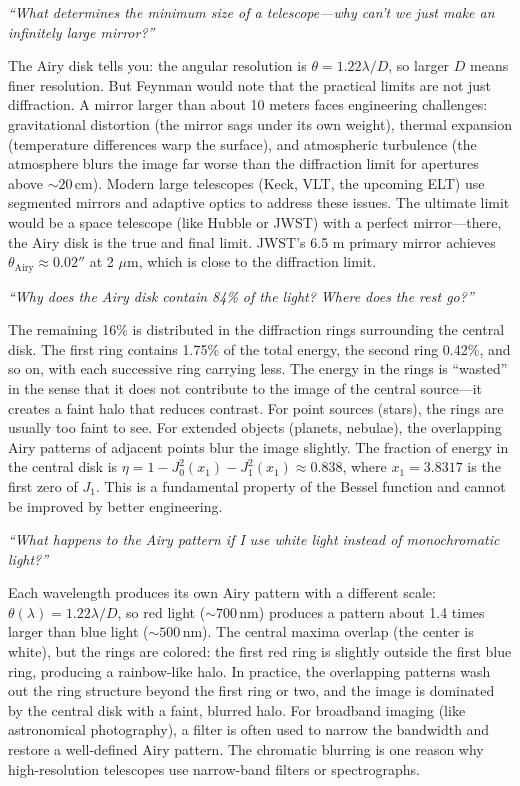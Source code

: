 \documentclass[11pt,openright]{book}
\begin{document}
\textit{``What determines the minimum size of a telescope---why can't we just make an infinitely large mirror?''}

The Airy disk tells you: the angular resolution is $\theta = 1.22\lambda/D$, so larger $D$ means finer resolution. But Feynman would note that the practical limits are not just diffraction. A mirror larger than about 10 meters faces engineering challenges: gravitational distortion (the mirror sags under its own weight), thermal expansion (temperature differences warp the surface), and atmospheric turbulence (the atmosphere blurs the image far worse than the diffraction limit for apertures above $\sim 20\,\text{cm}$). Modern large telescopes (Keck, VLT, the upcoming ELT) use segmented mirrors and adaptive optics to address these issues. The ultimate limit would be a space telescope (like Hubble or JWST) with a perfect mirror---there, the Airy disk is the true and final limit. JWST's 6.5 m primary mirror achieves $\theta_{\text{Airy}} \approx 0.02''$ at 2 $\mu$m, which is close to the diffraction limit.

\textit{``Why does the Airy disk contain 84\% of the light? Where does the rest go?''}

The remaining 16\% is distributed in the diffraction rings surrounding the central disk. The first ring contains 1.75\% of the total energy, the second ring 0.42\%, and so on, with each successive ring carrying less. The energy in the rings is ``wasted'' in the sense that it does not contribute to the image of the central source---it creates a faint halo that reduces contrast. For point sources (stars), the rings are usually too faint to see. For extended objects (planets, nebulae), the overlapping Airy patterns of adjacent points blur the image slightly. The fraction of energy in the central disk is $\eta = 1 - J_0^2(x_1) - J_1^2(x_1) \approx 0.838$, where $x_1 = 3.8317$ is the first zero of $J_1$. This is a fundamental property of the Bessel function and cannot be improved by better engineering.

\textit{``What happens to the Airy pattern if I use white light instead of monochromatic light?''}

Each wavelength produces its own Airy pattern with a different scale: $\theta(\lambda) = 1.22\lambda/D$, so red light ($\sim 700\,\text{nm}$) produces a pattern about 1.4 times larger than blue light ($\sim 500\,\text{nm}$). The central maxima overlap (the center is white), but the rings are colored: the first red ring is slightly outside the first blue ring, producing a rainbow-like halo. In practice, the overlapping patterns wash out the ring structure beyond the first ring or two, and the image is dominated by the central disk with a faint, blurred halo. For broadband imaging (like astronomical photography), a filter is often used to narrow the bandwidth and restore a well-defined Airy pattern. The chromatic blurring is one reason why high-resolution telescopes use narrow-band filters or spectrographs.
\end{document}

